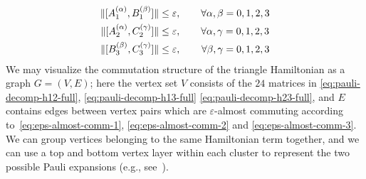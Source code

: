 \documentclass[a4paper,onecolumn,11pt]{quantumarticle}
\theoremstyle{plain}
\newcommand{\eps}{\varepsilon}
\begin{document}
\begin{align}
\|[A_1^{(\alpha)}, B_1^{(\beta)}]\| &\leq \eps, \quad\quad \forall 
\alpha,\beta=0,1,2,3 \label{eq:eps-almost-comm-1}\\
\|[A_2^{(\alpha)}, C_2^{(\gamma)}]\| &\leq \eps, \quad\quad \forall 
\alpha,\gamma=0,1,2,3 \label{eq:eps-almost-comm-2}\\
\|[B_3^{(\beta)}, C_3^{(\gamma)}]\| &\leq \eps, \quad\hspace{3.7mm} \forall 
\beta,\gamma=0,1,2,3\label{eq:eps-almost-comm-3}
\end{align}
We may visualize the commutation structure of the triangle Hamiltonian as a graph $G=(V,E)$; here the vertex set $V$ consists of the $24$ matrices in \eqref{eq:pauli-decomp-h12-full}, \eqref{eq:pauli-decomp-h13-full} \eqref{eq:pauli-decomp-h23-full}, and $E$ contains edges between vertex pairs which are $\eps$-almost commuting according to~\eqref{eq:eps-almost-comm-1}, \eqref{eq:eps-almost-comm-2} and \eqref{eq:eps-almost-comm-3}. We can group vertices belonging to the same Hamiltonian term together, and we can use a top and bottom vertex layer within each cluster to represent the two possible Pauli expansions (e.g., see~).
\end{document}
